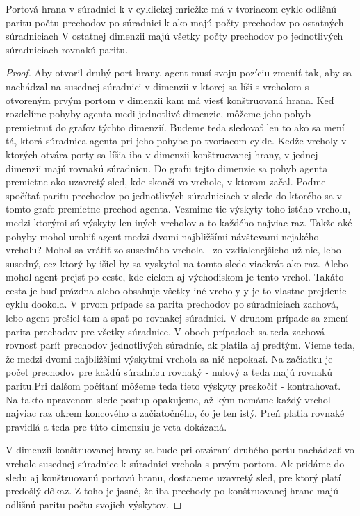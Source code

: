 \begin{lem}
Portová hrana v súradnici k v cyklickej mriežke má v tvoriacom cykle 
odlišnú paritu počtu prechodov po súradnici k ako majú počty prechodov 
po ostatných súradniciach
V ostatnej dimenzii majú všetky počty prechodov po jednotlivých súradniciach
rovnakú paritu.
\end{lem}
\begin{proof}
Aby otvoril druhý port hrany, agent musí svoju pozíciu zmeniť tak, 
aby sa nachádzal na susednej súradnici v dimenzii v ktorej sa líši s
vrcholom s otvoreným prvým portom v dimenzii kam má viesť konštruovaná hrana.
Keď rozdelíme pohyby agenta medi jednotlivé dimenzie, môžeme jeho pohyb
premietnuť do grafov týchto dimenzií. Budeme teda sledovať len to ako sa
mení tá, ktorá súradnica agenta pri jeho pohybe po tvoriacom cykle.
Keďže vrcholy v ktorých otvára porty sa líšia iba v dimenzii konštruovanej
hrany, v jednej dimenzii majú rovnakú súradnicu. Do grafu tejto dimenzie sa
pohyb agenta premietne ako uzavretý sled, kde skončí vo vrchole, v ktorom
začal.
Poďme spočítať paritu prechodov po jednotlivých súradniciach v slede do
ktorého sa v tomto grafe premietne prechod agenta.  Vezmime tie výskyty toho
istého vrcholu, medzi ktorými sú výskyty len iných vrcholov a to každého 
najviac raz. Takže aké pohyby mohol urobiť agent medzi dvomi najbližšími
návštevami nejakého vrcholu? Mohol sa vrátiť zo susedného vrchola - zo
vzdialenejšieho už nie, lebo susedný, cez ktorý by išiel by sa vyskytol na
tomto slede viackrát ako raz. 
Alebo mohol agent prejsť po ceste, kde cieľom
aj východiskom je tento vrchol. Takáto cesta je buď prázdna alebo obsahuje
všetky iné vrcholy y je to vlastne prejdenie cyklu dookola.
V prvom prípade sa parita prechodov po súradniciach zachová, lebo agent
prešiel tam a spať po rovnakej súradnici. V druhom prípade sa zmení parita
prechodov pre všetky súradnice. V oboch prípadoch sa teda zachová rovnosť
parít prechodov jednotlivých súradníc, ak platila aj predtým. 
Vieme teda, že medzi dvomi najbližšími výskytmi vrchola sa nič nepokazí. Na
začiatku je počet prechodov pre každú súradnicu rovnaký - nulový a teda majú
rovnakú paritu.Pri ďalšom počítaní môžeme teda tieto výskyty preskočiť -
kontrahovať. Na takto upravenom slede postup opakujeme, až kým nemáme každý
vrchol najviac raz okrem koncového a začiatočného, čo je ten istý. Preň
platia rovnaké pravidlá a teda pre túto dimenziu je veta dokázaná.

V dimenzii konštruovanej hrany sa bude pri otváraní druhého portu nachádzať
vo vrchole susednej súradnice k súradnici vrchola s prvým portom.
Ak pridáme do sledu aj konštruovanú portovú hranu, dostaneme uzavretý sled, pre ktorý
platí predošlý dôkaz. Z toho je jasné, že iba prechody po konštruovanej
hrane majú odlišnú paritu počtu svojich výskytov.
\end{proof}

